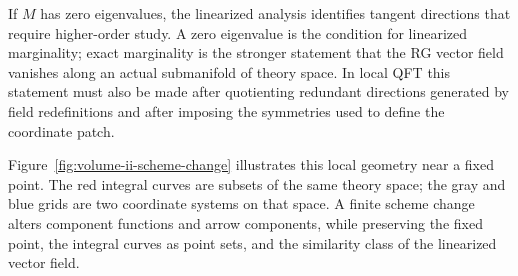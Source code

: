 If \(M\) has zero eigenvalues, the linearized analysis identifies tangent
directions that require higher-order study.  A zero eigenvalue is the
condition for linearized marginality; exact marginality is the stronger
statement that the RG vector field vanishes along an actual submanifold of
theory space.  In local QFT this statement must also be made after quotienting
redundant directions generated by field redefinitions and after imposing the
symmetries used to define the coordinate patch.

Figure~\ref{fig:volume-ii-scheme-change} illustrates this local geometry near
a fixed point.  The red integral curves are subsets of the same theory space;
the gray and blue grids are two coordinate systems on that space.  A finite
scheme change alters component functions and arrow components, while preserving
the fixed point, the integral curves as point sets, and the similarity class of
the linearized vector field.

